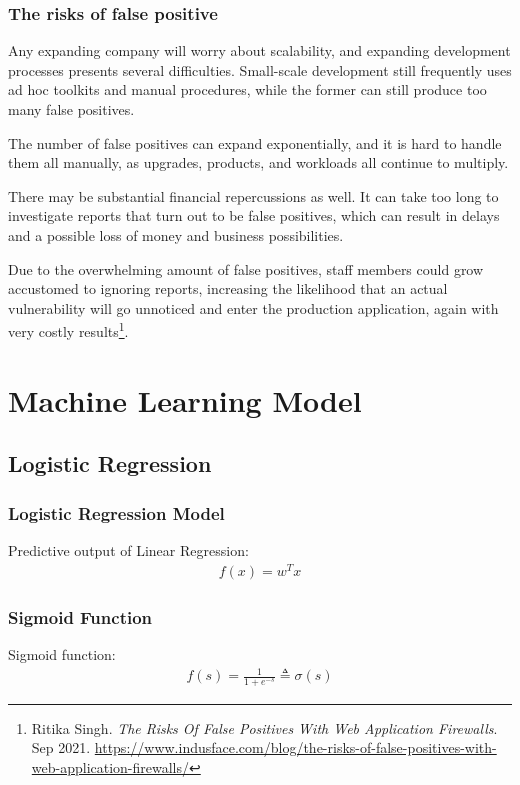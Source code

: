 \subsubsection{The risks of false positive} 
Any expanding company will worry about scalability, and expanding development processes presents several difficulties. Small-scale development still frequently uses ad hoc toolkits and manual procedures, while the former can still produce too many false positives.

The number of false positives can expand exponentially, and it is hard to handle them all manually, as upgrades, products, and workloads all continue to multiply.

There may be substantial financial repercussions as well. It can take too long to investigate reports that turn out to be false positives, which can result in delays and a possible loss of money and business possibilities.

Due to the overwhelming amount of false positives, staff members could grow accustomed to ignoring reports, increasing the likelihood that an actual vulnerability will go unnoticed and enter the production application, again with very costly results\footnote{Ritika Singh. \textit{The Risks Of False Positives With Web Application Firewalls}. Sep 2021. \url{https://www.indusface.com/blog/the-risks-of-false-positives-with-web-application-firewalls/}}.

\newpage
\section{Machine Learning Model} 
\label{sec:machine_model}
	
\subsection{Logistic Regression}
\label{subsec:logistic_regression}
\subsubsection{Logistic Regression Model}
Predictive output of Linear Regression:
\begin{align}
	f(x) = w^T x
\end{align}

\subsubsection{Sigmoid Function}
Sigmoid function:
\begin{align}
    f(s) = \frac{1}{1 + e^{-s}} \triangleq \sigma(s)
\end{align}

